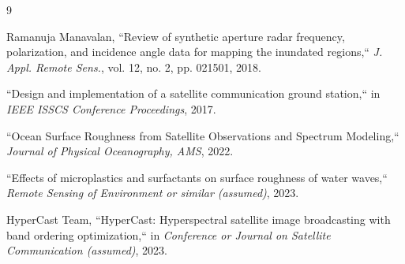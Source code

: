 \documentclass[12pt]{article}
\begin{document}
\newpage
\begin{thebibliography}{9}

Ramanuja Manavalan, ``Review of synthetic aperture radar frequency, polarization, and incidence angle data for mapping the inundated regions,`` \textit{J. Appl. Remote Sens.}, vol. 12, no. 2, pp. 021501, 2018.

``Design and implementation of a satellite communication ground station,`` in \textit{IEEE ISSCS Conference Proceedings}, 2017.

``Ocean Surface Roughness from Satellite Observations and Spectrum Modeling,`` \textit{Journal of Physical Oceanography, AMS}, 2022.

``Effects of microplastics and surfactants on surface roughness of water waves,`` \textit{Remote Sensing of Environment or similar (assumed)}, 2023.

HyperCast Team, ``HyperCast: Hyperspectral satellite image broadcasting with band ordering optimization,`` in \textit{Conference or Journal on Satellite Communication (assumed)}, 2023.

\end{thebibliography}
\end{document}
